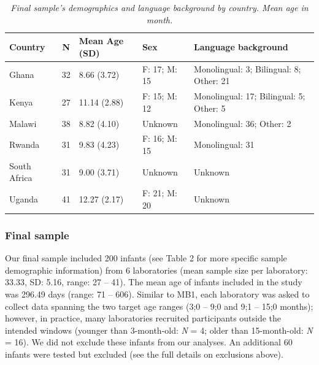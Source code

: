 \documentclass[
  ,man,floatsintext]{apa6}
\begin{document}
\begin{table}[!t]
\caption{\textit{Final sample's demographics and language background by country. Mean age in month.}}
\label{tab:country_demographics}
\centering
\begin{tabularx}{\textwidth}{lcllX}
\toprule
\textbf{Country} & \textbf{N} & \textbf{Mean Age (SD)} & \textbf{Sex} & \textbf{Language background} \\
\midrule
Ghana & 32 & 8.66 (3.72) & F: 17; M: 15 & Monolingual: 3; Bilingual: 8; Other: 21 \\
Kenya & 27 & 11.14 (2.88) & F: 15; M: 12 & Monolingual: 17; Bilingual: 5; Other: 5 \\
Malawi & 38 & 8.82 (4.10) & Unknown & Monolingual: 36; Other: 2 \\
Rwanda & 31 & 9.83 (4.23) & F: 16; M: 15 & Monolingual: 31\\
South Africa & 31 & 9.00 (3.71) & Unknown & Unknown \\
Uganda & 41 & 12.27 (2.17) & F: 21; M: 20 & Unknown \\
\bottomrule
\end{tabularx}
\end{table}

\hypertarget{final-sample}{%
\subsubsection{Final sample}\label{final-sample}}

Our final sample included 200 infants (see Table 2 for more specific sample demographic information) from 6 laboratories (mean sample size per laboratory: 33.33, SD: 5.16, range: 27 -- 41). The mean age of infants included in the study was 296.49 days (range: 71 -- 606). Similar to MB1, each laboratory was asked to collect data spanning the two target age ranges (3;0 -- 9;0 and 9;1 -- 15;0 months); however, in practice, many laboratories recruited participants outside the intended windows (younger than 3-month-old: \emph{N} = 4; older than 15-month-old: \emph{N} = 16). We did not exclude these infants from our analyses. An additional 60 infants were tested but excluded (see the full details on exclusions above).
\end{document}
